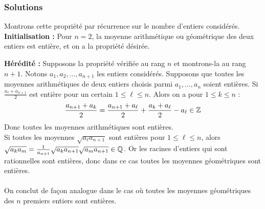 \subsubsection{Solutions}


\begin{sol}
Montrons cette propriété par récurrence sur le nombre d'entiers considérés. \\

\textbf{Initialisation :} Pour $n = 2$, la moyenne arithmétique ou géométrique des deux entiers est entière, et on a la propriété désirée.

\textbf{Hérédité :} Supposons la propriété vérifiée au rang $n$ et montrons-la au rang $n + 1$. Notons $a_1, a_2, \dots , a_{n + 1}$ les entiers considérés. Supposons que toutes les moyennes arithmétiques de deux entiers choisis parmi $a_1, \dots , a_n$ soient entières. Si $\frac{a_\ell + a_{n + 1}}2$ est entière pour un certain $1\le \ell\le n$. Alors on a pour $1\le k\le n$ :
$$\frac{a_{n + 1} + a_k}2 = \frac{a_{n + 1} + a_\ell}2 + \frac{a_k + a_\ell}2 - a_\ell\in \mathbb Z$$
Donc toutes les moyennes arithmétiques sont entières. \\
Si toutes les moyennes $\sqrt{a_\ell a_{n + 1}}$ sont entières pour $1\le \ell\le n$, alors $\sqrt{a_ka_m} = \frac1{a_{n + 1}}\sqrt{a_ka_{n + 1}}\sqrt{a_ma_{n + 1}}\in \mathbb Q$. Or les racines d'entiers qui sont rationnelles sont entières, donc dans ce cas toutes les moyennes géométriques sont entières. \\\\
On conclut de façon analogue dans le cas où toutes les moyennes géométriques des $n$ premiers entiers sont entières.
\end{sol}


